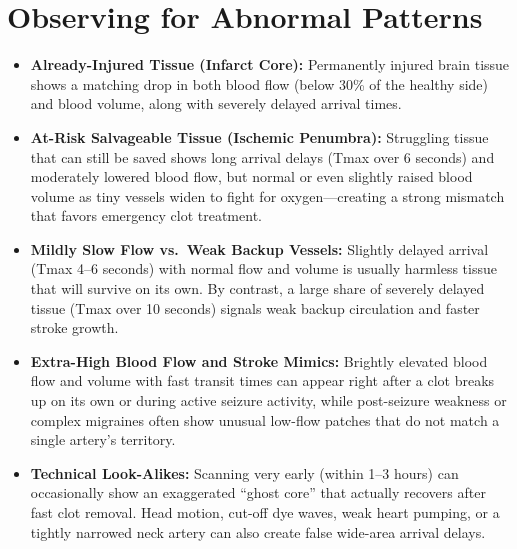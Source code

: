 \section{Observing for Abnormal Patterns}
\begin{itemize}
    \item \textbf{Already-Injured Tissue (Infarct Core):} Permanently injured brain tissue shows a matching drop in both blood flow (below 30\% of the healthy side) and blood volume, along with severely delayed arrival times.
    \item \textbf{At-Risk Salvageable Tissue (Ischemic Penumbra):} Struggling tissue that can still be saved shows long arrival delays (Tmax over 6 seconds) and moderately lowered blood flow, but normal or even slightly raised blood volume as tiny vessels widen to fight for oxygen---creating a strong mismatch that favors emergency clot treatment.
    \item \textbf{Mildly Slow Flow vs.\ Weak Backup Vessels:} Slightly delayed arrival (Tmax 4--6 seconds) with normal flow and volume is usually harmless tissue that will survive on its own. By contrast, a large share of severely delayed tissue (Tmax over 10 seconds) signals weak backup circulation and faster stroke growth.
    \item \textbf{Extra-High Blood Flow and Stroke Mimics:} Brightly elevated blood flow and volume with fast transit times can appear right after a clot breaks up on its own or during active seizure activity, while post-seizure weakness or complex migraines often show unusual low-flow patches that do not match a single artery's territory.
    \item \textbf{Technical Look-Alikes:} Scanning very early (within 1--3 hours) can occasionally show an exaggerated ``ghost core'' that actually recovers after fast clot removal. Head motion, cut-off dye waves, weak heart pumping, or a tightly narrowed neck artery can also create false wide-area arrival delays.
\end{itemize}

